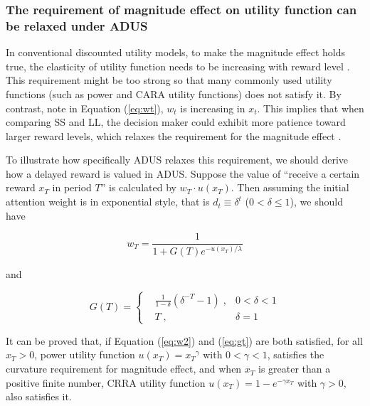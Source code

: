 \documentclass[
  12pt,
]{article}
\begin{document}
\hypertarget{the-requirement-of-magnitude-effect-on-utility-function-can-be-relaxed-under-adus}{%
\subsubsection{The requirement of magnitude effect on utility function
can be relaxed under
ADUS}\label{the-requirement-of-magnitude-effect-on-utility-function-can-be-relaxed-under-adus}}

In conventional discounted utility models, to make the magnitude effect
holds true, the elasticity of utility function needs to be increasing
with reward level \citep{loewenstein_anomalies_1992}. This requirement
might be too strong so that many commonly used utility functions (such
as power and CARA utility functions) does not satisfy it. By contrast,
note in Equation (\ref{eq:wt}), \(w_t\) is increasing in \(x_t\). This
implies that when comparing SS and LL, the decision maker could exhibit
more patience toward larger reward levels, which relaxes the requirement
for the magnitude effect \citep{noor_intertemporal_2011}.

To illustrate how specifically ADUS relaxes this requirement, we should
derive how a delayed reward is valued in ADUS. Suppose the value of
``receive a certain reward \(x_T\) in period \(T\)'' is calculated by
\(w_T \cdot u(x_T)\). Then assuming the initial attention weight is in
exponential style, that is \(d_t\equiv\delta^t\) (\(0<\delta\leq1\)), we
should have

\begin{equation}\tag{2}\label{eq:w2}  
w_T = \frac{1}{1+G(T)e^{-u(x_T)/\lambda}}  
\end{equation}

and

\begin{equation}\tag{3}\label{eq:gt} 
G(T) = \left\{ 
\begin{aligned} 
& \frac{1}{1-\delta}(\delta^{-T}-1) \; ,& 0<\delta<1\\ 
& T\; ,& \delta=1
\end{aligned} \right. 
\end{equation}

It can be proved that, if Equation (\ref{eq:w2}) and (\ref{eq:gt}) are
both satisfied, for all \(x_T>0\), power utility function
\(u(x_T)={x_T}^\gamma\) with \(0<\gamma<1\), satisfies the curvature
requirement for magnitude effect, and when \(x_T\) is greater than a
positive finite number, CRRA utility function
\(u(x_T)=1-e^{-\gamma x_T}\) with \(\gamma>0\), also satisfies it.
\end{document}
